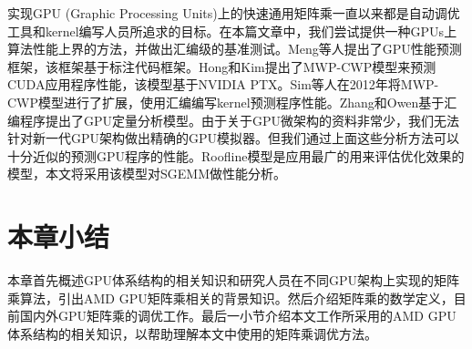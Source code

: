 实现GPU (Graphic Processing Units)上的快速通用矩阵乘一直以来都是自动调优工具和kernel编写人员所追求的目标。在本篇文章中，我们尝试提供一种GPUs上算法性能上界的方法，并做出汇编级的基准测试。Meng等人提出了GPU性能预测框架，该框架基于标注代码框架。Hong和Kim提出了MWP-CWP模型来预测CUDA应用程序性能，该模型基于NVIDIA PTX。Sim等人在2012年将MWP-CWP模型进行了扩展，使用汇编编写kernel预测程序性能。Zhang和Owen基于汇编程序提出了GPU定量分析模型。由于关于GPU微架构的资料非常少，我们无法针对新一代GPU架构做出精确的GPU模拟器。但我们通过上面这些分析方法可以十分近似的预测GPU程序的性能。Roofline模型是应用最广的用来评估优化效果的模型，本文将采用该模型对SGEMM做性能分析。

\section{本章小结}
本章首先概述GPU体系结构的相关知识和研究人员在不同GPU架构上实现的矩阵乘算法，引出AMD GPU矩阵乘相关的背景知识。然后介绍矩阵乘的数学定义，目前国内外GPU矩阵乘的调优工作。最后一小节介绍本文工作所采用的AMD GPU体系结构的相关知识，以帮助理解本文中使用的矩阵乘调优方法。




